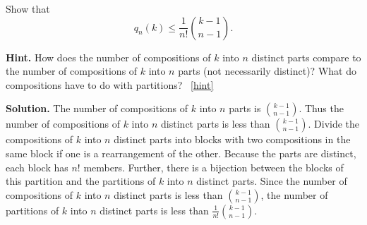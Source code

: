 \documentclass{book}
\begin{document}
\setcounter{project}{310}
\addtocounter{project}{-1}
\begin{activity}[]\label{activity-303}
\hypertarget{p-1555}{}%
Show that%
\begin{equation*}
q_n(k) \le \frac{1}{n!}\binom{k-1}{n-1}.
\end{equation*}
%
\par\smallskip%
\noindent\textbf{Hint.}\hypertarget{hint-198}{}\quad%
\hypertarget{p-1556}{}%
How does the number of compositions of \(k\) into \(n\) distinct parts compare to the number of compositions of \(k\) into \(n\) parts (not necessarily distinct)? What do compositions have to do with partitions?%
~\hfill{\tiny\hyperlink{a-310}{[hint]}\hypertarget{q-310}{}}\par\smallskip%
\noindent\textbf{Solution.}\hypertarget{solution-203}{}\quad%
\hypertarget{p-1557}{}%
The number of compositions of \(k\) into \(n\) parts is \(\binom{k-1}{n-1}\). Thus the number of compositions of \(k\) into \(n\) distinct parts is less than \(\binom{k-1}{n-1}\). Divide the compositions of \(k\) into \(n\) distinct parts into blocks with two compositions in the same block if one is a rearrangement of the other. Because the parts are distinct, each block has \(n!\) members. Further, there is a bijection between the blocks of this partition and the partitions of \(k\) into \(n\) distinct parts. Since the number of compositions of \(k\) into \(n\) distinct parts is less than \(\binom{k-1}{n-1}\), the number of partitions of \(k\) into \(n\) distinct parts is less than \(\frac{1}{n!}  \binom{k-1}{n-1}\).%
\end{activity}

\clearpage
\end{document}
